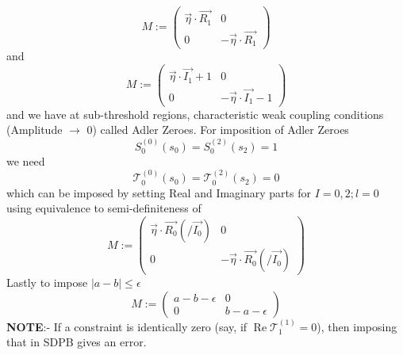 ﻿\documentclass[12pt,a4paper]{article}
\begin{document}
$$
M:=\left(\begin{array}{cc}
\vec{\eta} \cdot \vec{R_{1}} & 0 \\
0& -\vec{\eta} \cdot \vec{R_{1}}
\end{array}\right)
$$
and
$$
M:=\left(\begin{array}{cc}
\vec{\eta} \cdot \vec{I_{1}}+1 & 0 \\
0& -\vec{\eta} \cdot \vec{I_{1}}-1
\end{array}\right)
$$
and we have at sub-threshold regions, characteristic weak coupling conditions (Amplitude $\rightarrow$ 0) called Adler Zeroes. For imposition of Adler Zeroes
$$
S_{0}^{(0)}\left(s_{0}\right)=S_{0}^{(2)}\left(s_{2}\right)=1
$$
we need 
$$
\mathcal{T}_{0}^{(0)}\left(s_{0}\right)=\mathcal{T}_{0}^{(2)}\left(s_{2}\right)=0
$$
which can be imposed by setting Real and Imaginary parts for $I=0,2;l=0$ using equivalence to semi-definiteness of
$$
M:=\left(\begin{array}{cc}
\vec{\eta} \cdot \vec{R_{0}}(/\vec{I_{0}}) & 0 \\
0& -\vec{\eta} \cdot \vec{R_{0}}(/\vec{I_{0}}) 
\end{array}\right)
$$
Lastly to impose $|a-b|\leq \epsilon$
$$
M:=\left(\begin{array}{cc}
a-b-\epsilon & 0 \\
0&b-a-\epsilon 
\end{array}\right)
$$
\textbf{NOTE}:- If a constraint is identically zero (say, if $\operatorname{Re} \mathcal{T}_{1}^{(1)} = 0$), then imposing that in SDPB gives an error. 
\end{document}
